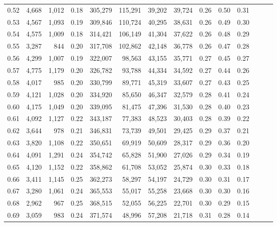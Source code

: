 \begin{tabular}{rrrrrrrrrrrrrr}
0.52 &   4,668 &  1,012 &  0.18 &  305,279 &  115,291 &  39,202 &  39,724 &  0.26 &  0.50 &      0.31 \\
0.53 &   4,567 &  1,093 &  0.19 &  309,846 &  110,724 &  40,295 &  38,631 &  0.26 &  0.49 &      0.30 \\
0.54 &   4,575 &  1,009 &  0.18 &  314,421 &  106,149 &  41,304 &  37,622 &  0.26 &  0.48 &      0.29 \\
0.55 &   3,287 &    844 &  0.20 &  317,708 &  102,862 &  42,148 &  36,778 &  0.26 &  0.47 &      0.28 \\
0.56 &   4,299 &  1,007 &  0.19 &  322,007 &   98,563 &  43,155 &  35,771 &  0.27 &  0.45 &      0.27 \\
0.57 &   4,775 &  1,179 &  0.20 &  326,782 &   93,788 &  44,334 &  34,592 &  0.27 &  0.44 &      0.26 \\
0.58 &   4,017 &    985 &  0.20 &  330,799 &   89,771 &  45,319 &  33,607 &  0.27 &  0.43 &      0.25 \\
0.59 &   4,121 &  1,028 &  0.20 &  334,920 &   85,650 &  46,347 &  32,579 &  0.28 &  0.41 &      0.24 \\
0.60 &   4,175 &  1,049 &  0.20 &  339,095 &   81,475 &  47,396 &  31,530 &  0.28 &  0.40 &      0.23 \\
0.61 &   4,092 &  1,127 &  0.22 &  343,187 &   77,383 &  48,523 &  30,403 &  0.28 &  0.39 &      0.22 \\
0.62 &   3,644 &    978 &  0.21 &  346,831 &   73,739 &  49,501 &  29,425 &  0.29 &  0.37 &      0.21 \\
0.63 &   3,820 &  1,108 &  0.22 &  350,651 &   69,919 &  50,609 &  28,317 &  0.29 &  0.36 &      0.20 \\
0.64 &   4,091 &  1,291 &  0.24 &  354,742 &   65,828 &  51,900 &  27,026 &  0.29 &  0.34 &      0.19 \\
0.65 &   4,120 &  1,152 &  0.22 &  358,862 &   61,708 &  53,052 &  25,874 &  0.30 &  0.33 &      0.18 \\
0.66 &   3,411 &  1,145 &  0.25 &  362,273 &   58,297 &  54,197 &  24,729 &  0.30 &  0.31 &      0.17 \\
0.67 &   3,280 &  1,061 &  0.24 &  365,553 &   55,017 &  55,258 &  23,668 &  0.30 &  0.30 &      0.16 \\
0.68 &   2,962 &    967 &  0.25 &  368,515 &   52,055 &  56,225 &  22,701 &  0.30 &  0.29 &      0.15 \\
0.69 &   3,059 &    983 &  0.24 &  371,574 &   48,996 &  57,208 &  21,718 &  0.31 &  0.28 &      0.14 \\

\end{tabular}
